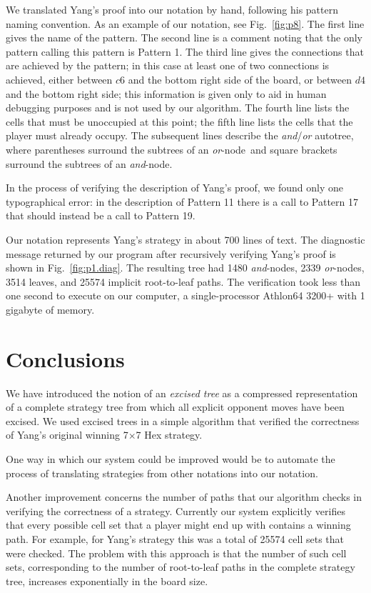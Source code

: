 \documentclass{llncs}
\def\aoat{{\it and}/{\it or} autotree}
\def\exct{excised tree}
\def\myAND{\mbox{\it and}}
\def\myOR{\mbox{\it or}}
\def\andnode{\myAND-node}
\def\ornode{\myOR-node}
\begin{document}
We translated Yang's proof into our notation by hand,
following his pattern naming convention.
As an example of our notation, see Fig.~\ref{fig:p8}.
The first line gives the name of the pattern.
The second line is a comment 
noting that the only pattern calling this pattern is Pattern 1.
The third line
gives the connections that are achieved by the pattern;
in this case at least one of two connections is achieved,
either between $c6$ and the bottom right side of the board,
or between $d4$ and the bottom right side;
this information is given only to aid in human debugging 
purposes and is not used by our algorithm.
The fourth line lists the cells that must 
be unoccupied at this point;
the fifth line lists the cells that the player must
already occupy.
The subsequent lines describe the \aoat,
where parentheses surround the subtrees of an \ornode\
and square brackets surround the subtrees of an \andnode.

In the process of verifying the description of Yang's proof,
we found only one typographical error:
in the description of Pattern 11 there is a call
to Pattern 17 that should instead be a call to Pattern 19.

Our notation represents Yang's strategy 
in about 700 lines of text.
The diagnostic message returned by our program
after recursively verifying Yang's proof is shown in Fig.~\ref{fig:p1.diag}.
The resulting tree had 1480 \andnode s, 2339 \ornode s,
3514 leaves, and 25574 implicit root-to-leaf paths.
The verification took less than one second to execute
on our computer,
a single-processor Athlon64 3200+ with 1 gigabyte of memory.



\section{Conclusions}
We have introduced the notion of an {\it \exct} as
a compressed representation of a complete strategy tree
from which all explicit opponent moves have been excised.
We used \exct s in a simple algorithm that verified the correctness
of Yang's original winning 7$\times$7 Hex strategy.

One way in which our system could be improved would be to
automate the process of translating strategies from
other notations into our notation.

Another improvement concerns the number of paths that
our algorithm checks in verifying the correctness of a strategy.
Currently our system explicitly verifies that every possible
cell set that a player might end up with contains a winning path.
For example, for Yang's strategy this was a total of 25574 cell sets
that were checked.
The problem with this approach is that the number of such cell sets,
corresponding to the number of root-to-leaf paths in the complete strategy tree,
increases exponentially in the board size.
\end{document}
